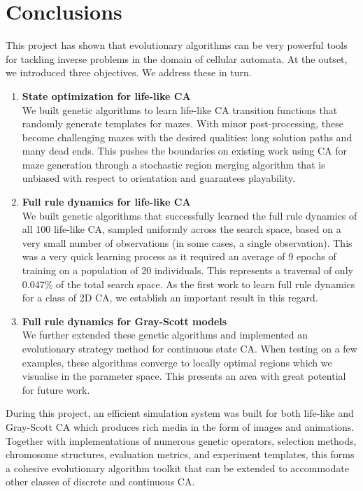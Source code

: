 \chapter{Conclusions}

This project has shown that evolutionary algorithms can be very powerful tools for tackling inverse problems in the domain of cellular automata. At the outset, we introduced three objectives. We address these in turn.
\begin{enumerate}
    \item \textbf{State optimization for life-like CA}\\
    We built genetic algorithms to learn life-like CA transition functions that randomly generate templates for mazes. With minor post-processing, these become challenging mazes with the desired qualities: long solution paths and many dead ends. This pushes the boundaries on existing work using CA for maze generation\cite{adams2017procedural, adams2018evolving} through a stochastic region merging algorithm that is unbiased with respect to orientation and guarantees playability.
    \item \textbf{Full rule dynamics for life-like CA}\\
    We built genetic algorithms that successfully learned the full rule dynamics of all 100 life-like CA, sampled uniformly across the search space, based on a very small number of observations (in some cases, a single observation). This was a very quick learning process as it required an average of 9 epochs of training on a population of 20 individuals. This represents a traversal of only 0.047\% of the total search space. As the first work to learn full rule dynamics for a class of 2D CA, we establish an important result in this regard.
    \item \textbf{Full rule dynamics for Gray-Scott models}\\
    We further extended these genetic algorithms and implemented an evolutionary strategy method for continuous state CA. When testing on a few examples, these algorithms converge to locally optimal regions which we visualise in the parameter space. This presents an area with great potential for future work.
\end{enumerate}

During this project, an efficient simulation system was built for both life-like and Gray-Scott CA which produces rich media in the form of images and animations. Together with implementations of numerous genetic operators, selection methods, chromosome structures, evaluation metrics, and experiment templates, this forms a cohesive evolutionary algorithm toolkit that can be extended to accommodate other classes of discrete and continuous CA.


